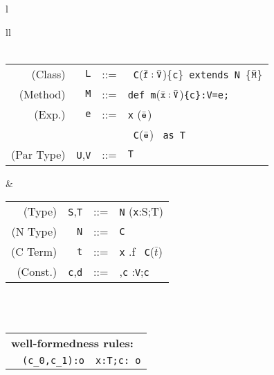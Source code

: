 
\begin{figure*}
\footnotesize
\begin{tabular}{l}
\begin{tabular}{ll}
 \\
\quad\\
\begin{tabular}{r@{\quad}rcl}
  (Class) & {\tt L} &{::=}& \klass\ {\tt C}($\bar{\tt f}:\bar{\tt V}$)\{{\tt c}\}\ {\tt extends}\ {\tt N}\ \{$\bar{\tt M}$\} \\
  (Method)& {\tt M} &{::=}& {\tt def}\ {\tt m}($\bar{\tt x}:\bar{\tt V}$){\tt \{c\}:V=e;}\\
  (Exp.)& {\tt e} &{::=}& {\tt x} \alt \this \alt {\tt e.f} \alt {\tt e.m}($\bar{\tt e}$) \\
  && \alt & \new\ {\tt C}($\bar{\tt e}$) \alt {\tt e}\ \mbox{{\tt as} {\tt T}} \\ 
  (Par Type) & {\tt U},{\tt V}&{::=} & {\tt T} \\
\end{tabular} 
&
\begin{tabular}{r@{\quad}rcl}
  (Type)& {\tt S},{\tt T}&{::=}& {\tt N} \alt {\tt T\{c\}} \alt ({\tt x}:S;T)\\
  (N Type) & {\tt N}&{::=}& {\tt C} \alt {\tt N\{c\}}\\
  (C Term) & {\tt t} &{::=}& {\tt x} \alt \self \alt \this \alt {\tt t}.f \alt \new\ {\tt C}($\bar{t}$)\\
  (Const.) & {\tt c},{\tt d} &{::=}&\true \alt {\tt t==t} \alt {\tt c},{\tt c} \alt {\tt x}:{\tt V};{\tt c}\\
\end{tabular} 
\end{tabular}
\quad \\
\quad\\
{\tabcolsep=0pt
\begin{tabular}{p{}p{}p{}}
\multicolumn{3}{l}{\bf \FX{} well-formedness rules:}\\
\infax[True]{\Gamma \vdash {\tt true}: {\tt o}}
&
\infrule[And]
	{\Gamma\tt  \vdash c_0: o \andalso \Gamma \vdash c_1: o}
	{\Gamma\tt \vdash (c_0,c_1):o}
&
\infrule[Exists]
	{\Gamma\tt \vdash t: T \andalso \Gamma \vdash c[t/x]:o}
	{\Gamma\tt \vdash x:T;c: o}
\\
\end{tabular}}
\quad\\
{\tabcolsep=0pt
\begin{tabular}{p{}p{}p{}}

\end{tabular}}
\end{tabular}
\end{figure*}
